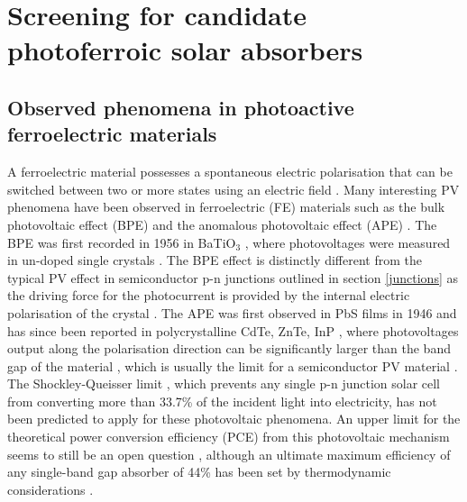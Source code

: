 \documentclass[11pt, twoside]{report}
\begin{document}
\chapter{Screening for candidate photoferroic solar absorbers}\label{chap:screening}

\section{Observed phenomena in photoactive ferroelectric materials}\label{ferroPVsection}
A ferroelectric material possesses a spontaneous electric polarisation that can be switched between two or more states using an electric field \cite{new_FE_PV_1}. Many interesting PV phenomena have been observed in ferroelectric (FE) materials such as the bulk photovoltaic effect (BPE) and the anomalous photovoltaic effect (APE) \cite{keith}. 
The BPE was first recorded in 1956 in BaTiO$_3$ \cite{keith_46}, where photovoltages were measured in un-doped single crystals \cite{keith}.
The BPE effect is distinctly different from the typical PV effect in semiconductor
p-n junctions outlined in section \ref{junctions} as the driving force for the photocurrent is provided by the internal electric polarisation of the crystal \cite{FE_PV_rev1}. 
The APE was first observed in PbS films in 1946 \cite{keith_54} and has since been reported in polycrystalline CdTe, ZnTe, InP \cite{keith_55, keith_56, keith_57}, where photovoltages output along the polarisation direction can be significantly larger than the band gap of the material \cite{FE_PV_rev1}, which is usually the limit for a semiconductor PV material \cite{keith}. 
The Shockley-Queisser limit \cite{SQ_1961}, which prevents any single p-n junction solar cell from converting more than 33.7\% of the incident light into electricity, has not been predicted to apply for these photovoltaic phenomena. An upper limit for the theoretical power conversion efficiency (PCE) from this photovoltaic mechanism seems to still be an open question \cite{ FE-PV_kirchartz, new_FE_PV}, although an ultimate maximum efficiency of any single-band gap absorber of 44\% has been set by thermodynamic considerations \cite{SQ_1961}. 
\end{document}
